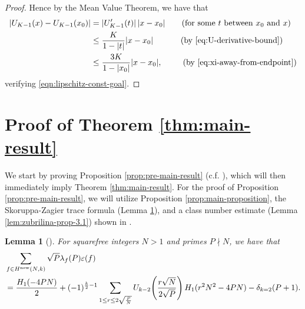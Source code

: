 \documentclass[12pt,letterpaper,reqno]{amsart}
\theoremstyle{plain}
\newtheorem{lemma}[theorem]{Lemma}
\theoremstyle{definition}
\numberwithin{equation}{section}
\numberwithin{figure}{section}
\numberwithin{table}{section}
\newcommand{\lrp}[1]{\!\left(#1\right)}
\newcommand{\new}{{\rm new}}
\begin{document}
\begin{proof}
Hence by the Mean Value Theorem, we have that
\begin{align}
    |U_{K-1}(x)-U_{K-1}(x_0)|
    &=
    |U_{K-1}'(t)|\,|x-x_0| 
    \qquad \text{(for some $t$ between $x_0$ and $x$)} 
    \\
    &\le
    \frac{K}{1-|t|}|x-x_0| 
    \qquad\quad\ \text{(by \eqref{eq:U-derivative-bound})}
    \\
    &\le
    \frac{3K}{1-|x_0|}|x-x_0|, 
    \qquad\ \,  \text{(by \eqref{eq:xi-away-from-endpoint})}
\end{align}
verifying \eqref{eqn:lipschitz-const-goal}.
\end{proof}

























\section{Proof of Theorem \ref{thm:main-result}}
\label{sec:proof-of-main-thm}

We start by proving Proposition \ref{prop:pre-main-result} (c.f. \cite[Equation (20)]{Zubrilina}), which will then immediately imply Theorem \ref{thm:main-result}.
For the proof of Proposition \ref{prop:pre-main-result}, we will utilize Proposition \ref{prop:main-proposition}, the Skoruppa-Zagier trace formula (Lemma \ref{lem:skoruppa-zagier-trace-formula}), and a class number estimate (Lemma \ref{lem:zubrilina-prop-3.1}) shown in \cite{Zubrilina}.



\begin{lemma}[{\cite[Section 2, equations (5) and (7)]{Skoruppa-Zagier}}] \label{lem:skoruppa-zagier-trace-formula}
For squarefree integers $N > 1$ and primes $P\nmid N$, we have that 
    \begin{align}
        &\sum_{f \in H^\new(N,k)}\sqrt{P}\lambda_f(P)\varepsilon(f) \\ 
        &= \frac{H_1(-4PN)}{2} + (-1)^{\frac{k}{2}-1}\sum_{1 \le r \le 2\sqrt{\frac{P}{N}}}U_{k-2}\lrp{\frac{r\sqrt{N}}{2\sqrt{P}}}H_1(r^2N^2-4PN) - \delta_{k=2}(P+1).
    \end{align}
\end{lemma}
\end{document}
